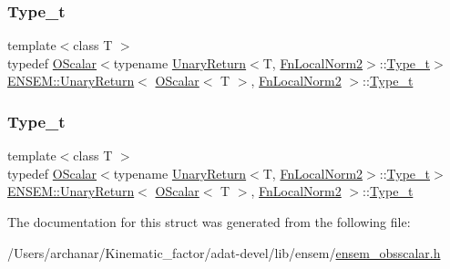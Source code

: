 \subsubsection{\texorpdfstring{Type\_t}{Type\_t}\hspace{0.1cm}{\footnotesize\ttfamily [2/3]}}
{\footnotesize\ttfamily template$<$class T $>$ \\
typedef \mbox{\hyperlink{classENSEM_1_1OScalar}{O\+Scalar}}$<$typename \mbox{\hyperlink{structENSEM_1_1UnaryReturn}{Unary\+Return}}$<$T, \mbox{\hyperlink{structENSEM_1_1FnLocalNorm2}{Fn\+Local\+Norm2}}$>$\+::\mbox{\hyperlink{structENSEM_1_1UnaryReturn_3_01OScalar_3_01T_01_4_00_01FnLocalNorm2_01_4_a610bc1debf55f6071875791495bca2a5}{Type\+\_\+t}}$>$ \mbox{\hyperlink{structENSEM_1_1UnaryReturn}{E\+N\+S\+E\+M\+::\+Unary\+Return}}$<$ \mbox{\hyperlink{classENSEM_1_1OScalar}{O\+Scalar}}$<$ T $>$, \mbox{\hyperlink{structENSEM_1_1FnLocalNorm2}{Fn\+Local\+Norm2}} $>$\+::\mbox{\hyperlink{structENSEM_1_1UnaryReturn_3_01OScalar_3_01T_01_4_00_01FnLocalNorm2_01_4_a610bc1debf55f6071875791495bca2a5}{Type\+\_\+t}}}

\mbox{\label{structENSEM_1_1UnaryReturn_3_01OScalar_3_01T_01_4_00_01FnLocalNorm2_01_4_a610bc1debf55f6071875791495bca2a5}} 
\subsubsection{\texorpdfstring{Type\_t}{Type\_t}\hspace{0.1cm}{\footnotesize\ttfamily [3/3]}}
{\footnotesize\ttfamily template$<$class T $>$ \\
typedef \mbox{\hyperlink{classENSEM_1_1OScalar}{O\+Scalar}}$<$typename \mbox{\hyperlink{structENSEM_1_1UnaryReturn}{Unary\+Return}}$<$T, \mbox{\hyperlink{structENSEM_1_1FnLocalNorm2}{Fn\+Local\+Norm2}}$>$\+::\mbox{\hyperlink{structENSEM_1_1UnaryReturn_3_01OScalar_3_01T_01_4_00_01FnLocalNorm2_01_4_a610bc1debf55f6071875791495bca2a5}{Type\+\_\+t}}$>$ \mbox{\hyperlink{structENSEM_1_1UnaryReturn}{E\+N\+S\+E\+M\+::\+Unary\+Return}}$<$ \mbox{\hyperlink{classENSEM_1_1OScalar}{O\+Scalar}}$<$ T $>$, \mbox{\hyperlink{structENSEM_1_1FnLocalNorm2}{Fn\+Local\+Norm2}} $>$\+::\mbox{\hyperlink{structENSEM_1_1UnaryReturn_3_01OScalar_3_01T_01_4_00_01FnLocalNorm2_01_4_a610bc1debf55f6071875791495bca2a5}{Type\+\_\+t}}}



The documentation for this struct was generated from the following file\+:\begin{DoxyCompactItemize}
\item 
/\+Users/archanar/\+Kinematic\+\_\+factor/adat-\/devel/lib/ensem/\mbox{\hyperlink{adat-devel_2lib_2ensem_2ensem__obsscalar_8h}{ensem\+\_\+obsscalar.\+h}}\end{DoxyCompactItemize}
